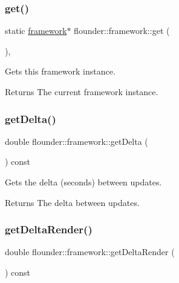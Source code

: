 \subsubsection{\texorpdfstring{get()}{get()}}
{\footnotesize\ttfamily static \hyperlink{classflounder_1_1framework}{framework}$\ast$ flounder\+::framework\+::get (\begin{DoxyParamCaption}{ }\end{DoxyParamCaption})\hspace{0.3cm}{\ttfamily [inline]}, {\ttfamily [static]}}



Gets this framework instance. 

\begin{DoxyReturn}{Returns}
The current framework instance. 
\end{DoxyReturn}
\mbox{\label{classflounder_1_1framework_a46219c3eae921c9819e7228ec2d8d904}} 
\subsubsection{\texorpdfstring{get\+Delta()}{getDelta()}}
{\footnotesize\ttfamily double flounder\+::framework\+::get\+Delta (\begin{DoxyParamCaption}{ }\end{DoxyParamCaption}) const\hspace{0.3cm}{\ttfamily [inline]}}



Gets the delta (seconds) between updates. 

\begin{DoxyReturn}{Returns}
The delta between updates. 
\end{DoxyReturn}
\mbox{\label{classflounder_1_1framework_ae4020c8f9baeda03fe5ef8ceb6f1d286}} 
\subsubsection{\texorpdfstring{get\+Delta\+Render()}{getDeltaRender()}}
{\footnotesize\ttfamily double flounder\+::framework\+::get\+Delta\+Render (\begin{DoxyParamCaption}{ }\end{DoxyParamCaption}) const\hspace{0.3cm}{\ttfamily [inline]}}



